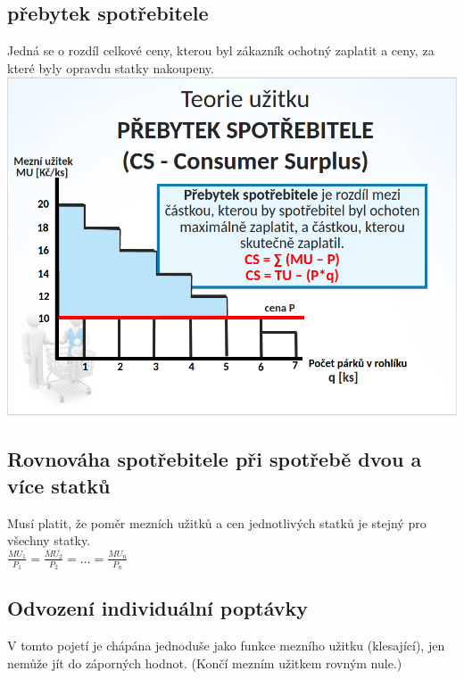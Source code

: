 \subsection{přebytek spotřebitele}
Jedná se o rozdíl celkové ceny, kterou byl zákazník ochotný zaplatit a ceny, za které byly opravdu statky nakoupeny. \\
\includegraphics[width=16cm]{images/05_prebytek_spotrebitele.png}

\subsection{Rovnováha spotřebitele při spotřebě dvou a více statků}
Musí platit, že poměr mezních užitků a cen jednotlivých statků je stejný pro všechny statky. \\
$\frac{MU_1}{P_1}=\frac{MU_2}{P_2}=\dots=\frac{MU_n}{P_n}$

\subsection{Odvození individuální poptávky}
V tomto pojetí je chápána jednoduše jako funkce mezního užitku (klesající), jen nemůže jít do záporných hodnot. (Končí mezním užitkem rovným nule.)
